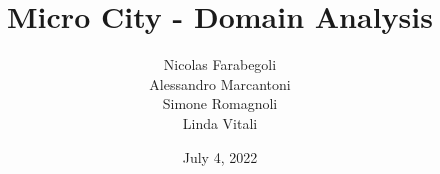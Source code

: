 \title{Micro City - Domain Analysis}
\author{Nicolas Farabegoli\\
Alessandro Marcantoni\\
Simone Romagnoli\\
Linda Vitali}
\date{July 4, 2022}
